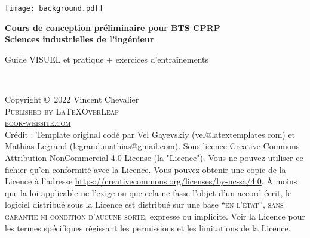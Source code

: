 \documentclass[
	11pt, %
	fleqn, %
	a4paper, %
]{LegrandOrangeBook}
\begin{document}
\usetikzlibrary{patterns} %


\titlepage %
	{\texttt{[image: background.pdf]}} %
	{ %
		\centering\sffamily %
		{\Huge\bfseries Cours de conception préliminaire pour BTS CPRP\\ Sciences industrielles de l'ingénieur\par} %
		\vspace{16pt} %
		{\LARGE Guide VISUEL et pratique + exercices d'entraînements\par} %
		\vspace{24pt} %
		{\huge\bfseries \par} %
	}


\thispagestyle{empty} %

~\vfill %

\noindent Copyright \copyright\ 2022 Vincent Chevalier\\ %

\noindent \textsc{Published by \LaTeX OverLeaf}\\ %

\noindent \textsc{\href{https://www.latextemplates.com/template/legrand-orange-book}{book-website.com}}\\ %
\noindent
Crédit : Template original codé par Vel Gayevskiy (vel@latextemplates.com) et Mathias Legrand (legrand.mathias@gmail.com). Sous licence Creative Commons Attribution-NonCommercial 4.0 License (la "Licence"). Vous ne pouvez utiliser ce fichier qu'en conformité avec la Licence. Vous pouvez obtenir une copie de la Licence à l'adresse  \url{https://creativecommons.org/licenses/by-nc-sa/4.0}. À moins que la loi applicable ne l'exige ou que cela ne fasse l'objet d'un accord écrit, le logiciel distribué sous la Licence est distribué sur une base \textsc{``en l'état'', sans garantie ni condition d'aucune sorte}, expresse ou implicite. Voir la Licence pour les termes spécifiques régissant les permissions et les limitations de la Licence.\\ %
\end{document}
